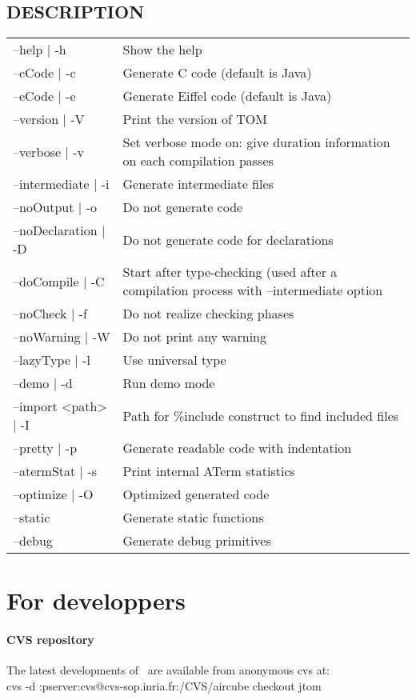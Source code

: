 \subsection{DESCRIPTION}
\begin{tabular}{|l|l|}
\hline
--help | -h&            Show the help \\
--cCode | -c&           Generate C code (default is Java)\\
--eCode | -e&           Generate Eiffel code (default is Java)\\
--version | -V&         Print the version of TOM\\
--verbose | -v&         Set verbose mode on: give duration information
on each compilation passes\\
--intermediate | -i&    Generate intermediate files \\
--noOutput | -o&        Do not generate code \\
--noDeclaration | -D&   Do not generate code for declarations \\
--doCompile | -C&       Start after type-checking (used after a
compilation process with --intermediate option\\
--noCheck | -f&         Do not realize checking phases \\
--noWarning | -W&       Do not print any warning \\
--lazyType | -l&        Use universal type \\
--demo | -d&            Run demo mode \\
--import <path> | -I&   Path for \%include construct to find included files\\
--pretty | -p&          Generate readable code with indentation \\
--atermStat | -s&       Print internal ATerm statistics \\
--optimize | -O&        Optimized generated code \\
--static&               Generate static functions \\
--debug&                Generate debug primitives \\
\hline
\end{tabular}


\section{For developpers}\label{developpers}
\paragraph{CVS repository}
The latest developments of \TOM\ are available from anonymous cvs at:
\\cvs -d :pserver:cvs@cvs-sop.inria.fr:/CVS/aircube checkout jtom
